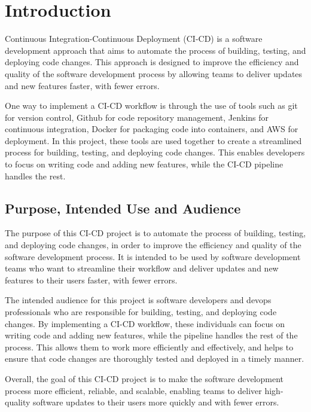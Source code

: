 \documentclass[
  10pt,
  paper=a4,
  ,captions=tableheading
]{scrartcl}
\begin{document}
\hypertarget{introduction}{%
\section{Introduction}\label{introduction}}

Continuous Integration-Continuous Deployment (CI-CD) is a software
development approach that aims to automate the process of building,
testing, and deploying code changes. This approach is designed to
improve the efficiency and quality of the software development process
by allowing teams to deliver updates and new features faster, with fewer
errors.

One way to implement a CI-CD workflow is through the use of tools such
as git for version control, Github for code repository management,
Jenkins for continuous integration, Docker for packaging code into
containers, and AWS for deployment. In this project, these tools are
used together to create a streamlined process for building, testing, and
deploying code changes. This enables developers to focus on writing code
and adding new features, while the CI-CD pipeline handles the rest.

\hypertarget{purpose-intended-use-and-audience}{%
\subsection{Purpose, Intended Use and
Audience}\label{purpose-intended-use-and-audience}}

The purpose of this CI-CD project is to automate the process of
building, testing, and deploying code changes, in order to improve the
efficiency and quality of the software development process. It is
intended to be used by software development teams who want to streamline
their workflow and deliver updates and new features to their users
faster, with fewer errors.

The intended audience for this project is software developers and devops
professionals who are responsible for building, testing, and deploying
code changes. By implementing a CI-CD workflow, these individuals can
focus on writing code and adding new features, while the pipeline
handles the rest of the process. This allows them to work more
efficiently and effectively, and helps to ensure that code changes are
thoroughly tested and deployed in a timely manner.

Overall, the goal of this CI-CD project is to make the software
development process more efficient, reliable, and scalable, enabling
teams to deliver high-quality software updates to their users more
quickly and with fewer errors.
\end{document}
